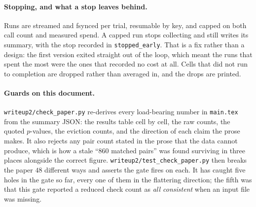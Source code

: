 \documentclass[11pt]{article}
\begin{document}
\paragraph{Stopping, and what a stop leaves behind.} Runs are streamed and fsynced per
trial, resumable by key, and capped on both call count and measured spend. A capped run
stops collecting and still writes its summary, with the stop recorded in
\texttt{stopped\_early}. That is a fix rather than a design: the first version exited
straight out of the loop, which meant the runs that spent the most were the ones that
recorded no cost at all. Cells that did not run to completion are dropped rather than
averaged in, and the drops are printed.

\paragraph{Guards on this document.} \texttt{writeup2/check\_paper.py} re-derives every
load-bearing number in \texttt{main.tex} from the summary JSON: the results table cell by
cell, the raw counts, the quoted $p$-values, the eviction counts, and the direction of
each claim the prose makes. It also rejects any pair
count stated in the prose that the data cannot produce, which is how a stale ``$860$
matched pairs'' was found surviving in three places alongside the correct figure.
\texttt{writeup2/test\_check\_paper.py} then breaks the paper $48$ different ways and
asserts the gate fires on each. It has caught five holes in the gate so far, every one of
them in the flattering direction; the fifth was that this gate reported a reduced check
count as \emph{all consistent} when an input file was missing.
\end{document}
